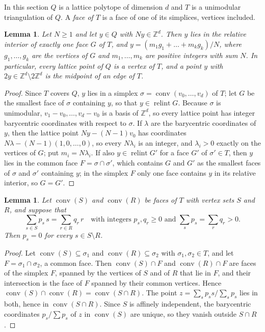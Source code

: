 \documentclass[11pt]{article}
\newtheorem{lemma}[theorem]{Lemma}
\theoremstyle{definition}
\newcommand{\Z}{\mathbb{Z}}
\newcommand{\conv}{\operatorname{conv}}
\newcommand{\relint}{\operatorname{relint}}
\begin{document}
In this section $Q$ is a lattice polytope of dimension $d$ and $T$ is a
unimodular triangulation of $Q$. A \emph{face of $T$} is a face of one of its
simplices, vertices included.

\begin{lemma}\label{lem:den}
Let $N\ge1$ and let $y\in Q$ with $Ny\in\Z^d$. Then $y$ lies in the relative
interior of exactly one face $G$ of $T$, and $y=(m_1g_1+\dots+m_kg_k)/N$,
where $g_1,\dots,g_k$ are the vertices of $G$ and $m_1,\dots,m_k$ are
positive integers with sum $N$. In particular, every lattice point of $Q$
is a vertex of $T$, and a point $y$ with $2y\in\Z^d\setminus 2\Z^d$ is the
midpoint of an edge of $T$.
\end{lemma}

\begin{proof}
Since $T$ covers $Q$, $y$ lies in a simplex $\sigma=\conv(v_0,\dots,v_d)$ of
$T$; let $G$ be the smallest face of $\sigma$ containing $y$, so that
$y\in\relint G$. Because $\sigma$ is unimodular, $v_1-v_0,\dots,v_d-v_0$ is a
basis of $\Z^d$, so every lattice point has integer barycentric coordinates
with respect to $\sigma$. If $\lambda$ are the barycentric coordinates of $y$,
then the lattice point $Ny-(N-1)v_0$ has coordinates
$N\lambda-(N-1)(1,0,\dots,0)$, so every $N\lambda_i$ is an integer, and
$\lambda_i>0$ exactly on the vertices of $G$; put $m_i=N\lambda_i$. If also
$y\in\relint G'$ for a face $G'$ of $\sigma'\in T$, then $y$ lies in the
common face $F=\sigma\cap\sigma'$, which contains $G$ and $G'$ as the smallest
faces of $\sigma$ and $\sigma'$ containing $y$; in the simplex $F$ only one
face contains $y$ in its relative interior, so $G=G'$.
\end{proof}

\begin{lemma}\label{lem:common}
Let $\conv(S)$ and $\conv(R)$ be faces of $T$ with vertex sets $S$ and $R$,
and suppose that
\[
\sum_{s\in S}p_s\,s=\sum_{r\in R}q_r\,r\quad\text{with integers } p_s,q_r\ge0
\text{ and } \sum_s p_s=\sum_r q_r>0.
\]
Then $p_s=0$ for every $s\in S\setminus R$.
\end{lemma}

\begin{proof}
Let $\conv(S)\subseteq\sigma_1$ and $\conv(R)\subseteq\sigma_2$ with
$\sigma_1,\sigma_2\in T$, and let $F=\sigma_1\cap\sigma_2$, a common face.
Then $\conv(S)\cap F$ and $\conv(R)\cap F$ are faces of the simplex $F$,
spanned by the vertices of $S$ and of $R$ that lie in $F$, and their
intersection is the face of $F$ spanned by their common vertices. Hence
$\conv(S)\cap\conv(R)=\conv(S\cap R)$. The point
$z=\sum_s p_s s/\sum_s p_s$ lies in both, hence in $\conv(S\cap R)$. Since
$S$ is affinely independent, the barycentric coordinates $p_s/\sum p_s$ of
$z$ in $\conv(S)$ are unique, so they vanish outside $S\cap R$.
\end{proof}
\end{document}
